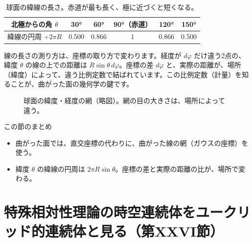 \documentclass[a4paper,11pt,openany]{ltjsbook}
\begin{document}
\begin{table}[htbp]
\centering
\begin{tabular}{c|ccccc}
\toprule
北極からの角 $\theta$ & 30° & 60° & 90°（赤道） & 120° & 150°\\
\midrule
緯線の円周 $\div2\pi R$ & 0.500 & 0.866 & 1 & 0.866 & 0.500\\
\bottomrule
\end{tabular}
\caption{球面の緯線の長さ。赤道が最も長く、極に近づくと短くなる。}
\end{table}

線の長さの測り方は、座標の取り方で変わります。経度が $d\varphi$ だけ違う2点の、緯度 $\theta$ の線の上での距離は $R\sin\theta\,d\varphi$。座標の差 $d\varphi$ と、実際の距離が、場所（緯度）によって、違う比例定数で結ばれています。この比例定数（計量）を知ることが、曲がった面の幾何学の鍵です。

\begin{figure}[htbp]
\centering
{}
\caption{球面の緯度・経度の網（略図）。網の目の大きさは、場所によって違う。}
\end{figure}

\begin{pointbox}{この節のまとめ}
\begin{itemize}[leftmargin=*]
\item 曲がった面では、直交座標の代わりに、曲がった線の網（ガウスの座標）を使う。
\item 緯度 $\theta$ の緯線の円周は $2\pi R\sin\theta$。座標の差と実際の距離の比が、場所で変わる。
\end{itemize}
\end{pointbox}

\chapter{特殊相対性理論の時空連続体をユークリッド的連続体と見る（第XXVI節）}
\end{document}
